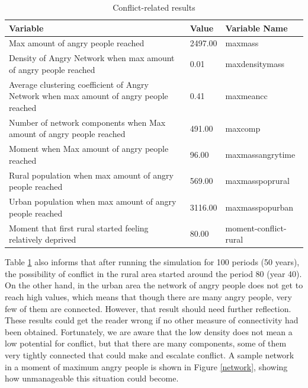 \documentclass{article}
\begin{document}
\begin{table}[ht]
  \centering
  \caption{Conflict-related results}

{\scriptsize
\begin{tabular}{m{3.75in}p{0.4in}p{1.3in}}
  \hline
Variable & Value & Variable Name \\ 
  \hline
Max amount of angry people reached & 2497.00 & maxmass \\ 
  Density of Angry Network when max amount of angry people reached & 0.01 & maxdensitymass \\ 
  Average clustering coefficient of Angry Network when max amount of angry people reached & 0.41 & maxmeancc \\ 
  Number of network components when Max amount of angry people reached & 491.00 & maxcomp \\ 
  Moment when Max amount of angry people reached & 96.00 & maxmassangrytime \\ 
  Rural population when max amount of angry people reached & 569.00 & maxmasspoprural \\ 
  Urban population when max amount of angry people reached & 3116.00 & maxmasspopurban \\ 
  Moment that first rural started feeling relatively deprived & 80.00 & moment-conflict-rural \\ 
   \hline
\end{tabular}
}
\label{conflict-out}
\end{table}



Table \ref{conflict-out} also informs that after running the simulation for 100 periods (50 years), the possibility of conflict in the rural area started around the period 80 (year 40). On the other hand, in the urban area the network of angry people does not get to reach high values, which means that though there are many angry people, very few of them are connected. However, that result should need further reflection. These results could get the reader wrong if no other measure of connectivity had been obtained. Fortunately, we are aware that the low density does not mean a low potential for conflict, but that there are many components, some of them very tightly connected that could make and escalate conflict. A sample network in a moment of maximum angry people is shown in Figure \ref{network}, showing how unmanageable this situation could become.
\end{document}
